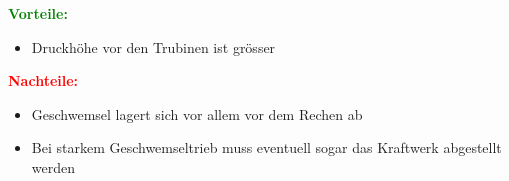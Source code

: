 \textbf{\textcolor{green}{Vorteile:}}  
\begin{itemize}
    \item Druckhöhe vor den Trubinen ist grösser
\end{itemize}

\textbf{\textcolor{red}{Nachteile:}}  

\begin{itemize}
    \item Geschwemsel lagert sich vor allem vor dem Rechen ab
    \item Bei starkem Geschwemseltrieb muss eventuell sogar das Kraftwerk abgestellt werden
\end{itemize}

